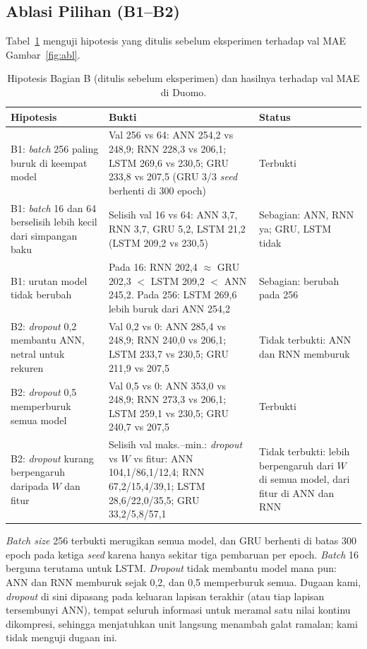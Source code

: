 \documentclass[10pt,twocolumn,a4paper]{article}
\begin{document}
\subsection{Ablasi Pilihan (B1--B2)}
Tabel~\ref{tab:hip} menguji hipotesis yang ditulis sebelum eksperimen terhadap val MAE Gambar~\ref{fig:abl}.

\begin{table}[t]
  \centering
  \caption{Hipotesis Bagian B (ditulis sebelum eksperimen) dan hasilnya terhadap val MAE di Duomo.}
  \label{tab:hip}
  \footnotesize
  \renewcommand{\arraystretch}{1.15}
  \begin{tabular}{@{}p{}p{}p{}@{}}
    \toprule
    Hipotesis & Bukti & Status \\
    \midrule
    B1: \textit{batch} 256 paling buruk di keempat model & Val 256 vs 64: ANN 254,2 vs 248,9; RNN 228,3 vs 206,1; LSTM 269,6 vs 230,5; GRU 233,8 vs 207,5 (GRU 3/3 \textit{seed} berhenti di 300 epoch) & Terbukti \\
    B1: \textit{batch} 16 dan 64 berselisih lebih kecil dari simpangan baku & Selisih val 16 vs 64: ANN 3,7, RNN 3,7, GRU 5,2, LSTM 21,2 (LSTM 209,2 vs 230,5) & Sebagian: ANN, RNN ya; GRU, LSTM tidak \\
    B1: urutan model tidak berubah & Pada 16: RNN 202,4 $\approx$ GRU 202,3 $<$ LSTM 209,2 $<$ ANN 245,2. Pada 256: LSTM 269,6 lebih buruk dari ANN 254,2 & Sebagian: berubah pada 256 \\
    B2: \textit{dropout} 0,2 membantu ANN, netral untuk rekuren & Val 0,2 vs 0: ANN 285,4 vs 248,9; RNN 240,0 vs 206,1; LSTM 233,7 vs 230,5; GRU 211,9 vs 207,5 & Tidak terbukti: ANN dan RNN memburuk \\
    B2: \textit{dropout} 0,5 memperburuk semua model & Val 0,5 vs 0: ANN 353,0 vs 248,9; RNN 273,3 vs 206,1; LSTM 259,1 vs 230,5; GRU 240,7 vs 207,5 & Terbukti \\
    B2: \textit{dropout} kurang berpengaruh daripada $W$ dan fitur & Selisih val maks.--min.: \textit{dropout} vs $W$ vs fitur: ANN 104,1/86,1/12,4; RNN 67,2/15,4/39,1; LSTM 28,6/22,0/35,5; GRU 33,2/5,8/57,1 & Tidak terbukti: lebih berpengaruh dari $W$ di semua model, dari fitur di ANN dan RNN \\
    \bottomrule
  \end{tabular}
\end{table}

\textit{Batch size} 256 terbukti merugikan semua model, dan GRU berhenti di batas 300 epoch pada ketiga \textit{seed} karena hanya sekitar tiga pembaruan per epoch. \textit{Batch} 16 berguna terutama untuk LSTM. \textit{Dropout} tidak membantu model mana pun: ANN dan RNN memburuk sejak 0,2, dan 0,5 memperburuk semua. Dugaan kami, \textit{dropout} di sini dipasang pada keluaran lapisan terakhir (atau tiap lapisan tersembunyi ANN), tempat seluruh informasi untuk meramal satu nilai kontinu dikompresi, sehingga menjatuhkan unit langsung menambah galat ramalan; kami tidak menguji dugaan ini.
\end{document}
